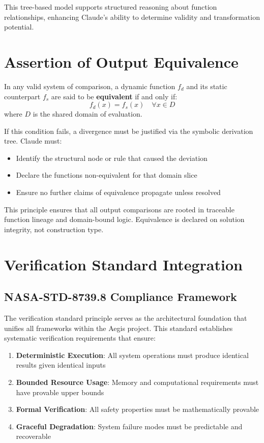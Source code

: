 \documentclass{article}
\begin{document}
This tree-based model supports structured reasoning about function relationships, enhancing Claude's ability to determine validity and transformation potential.

\section{Assertion of Output Equivalence}

In any valid system of comparison, a dynamic function $f_d$ and its static counterpart $f_s$ are said to be \textbf{equivalent} if and only if:
\[ f_d(x) = f_s(x) \quad \forall x \in D \]
where $D$ is the shared domain of evaluation.

If this condition fails, a divergence must be justified via the symbolic derivation tree. Claude must:
\begin{itemize}
    \item Identify the structural node or rule that caused the deviation
    \item Declare the functions non-equivalent for that domain slice
    \item Ensure no further claims of equivalence propagate unless resolved
\end{itemize}

This principle ensures that all output comparisons are rooted in traceable function lineage and domain-bound logic. Equivalence is declared on solution integrity, not construction type.

\section{Verification Standard Integration}

\subsection{NASA-STD-8739.8 Compliance Framework}

The verification standard principle serves as the architectural foundation that unifies all frameworks within the Aegis project. This standard establishes systematic verification requirements that ensure:

\begin{enumerate}
    \item \textbf{Deterministic Execution}: All system operations must produce identical results given identical inputs
    \item \textbf{Bounded Resource Usage}: Memory and computational requirements must have provable upper bounds
    \item \textbf{Formal Verification}: All safety properties must be mathematically provable
    \item \textbf{Graceful Degradation}: System failure modes must be predictable and recoverable
\end{enumerate}
\end{document}
